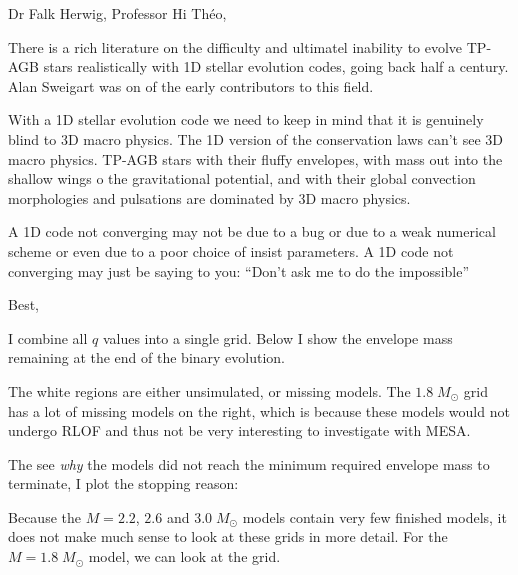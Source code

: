 \documentclass[a4paper,10pt]{article}
\begin{document}
\hspace{0.1\textwidth}\begin{minipage}{1.45\textwidth}
\begin{shadequote}{Dr Falk Herwig, Professor}
Hi Théo,

There is a rich literature on the difficulty and ultimatel inability to evolve TP-AGB stars realistically with 1D stellar evolution codes, going back half a century. Alan Sweigart was on of the early contributors to this field.

With a 1D stellar evolution code we need to keep in mind that it is genuinely blind to 3D macro physics. The 1D version of the conservation laws can’t see 3D macro physics. TP-AGB stars with their fluffy envelopes, with mass out into the shallow wings o the gravitational potential, and with their global convection morphologies and pulsations are dominated by 3D macro physics.

A 1D code not converging may not be due to a bug or due to a weak numerical scheme or even due to a poor choice of insist parameters. A 1D code not converging may just be saying to you: “Don’t ask me to do the impossible”

Best,
\end{shadequote}
\end{minipage}

\nextpage

I combine all \(q\) values into a single grid. Below I show the envelope mass remaining at the end of the binary evolution.
\begin{figure}[ht]
    \centering
\end{figure}

The white regions are either unsimulated, or missing models. The \(1.8\;M_\odot \) grid has a lot of missing models on the right, which is because these models would not undergo RLOF and thus not be very interesting to investigate with MESA.

The see \emph{why} the models did not reach the minimum required envelope mass to terminate, I plot the stopping reason:

\begin{figure}[ht]
    \centering
\end{figure}

Because the \(M=2.2\), \(2.6\) and \(3.0\;M_\odot \) models contain very few finished models, it does not make much sense to look at these grids in more detail. For the \(M=1.8\;M_\odot \) model, we can look at the grid.
\end{document}

